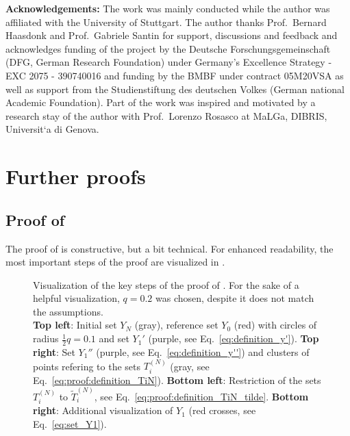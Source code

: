 \documentclass[a4paper, 10pt]{article}
\newlength\fwidth
\begin{document}
\textbf{Acknowledgements:}
The work was mainly conducted while the author was affiliated with the University of Stuttgart.
The author thanks Prof.\ Bernard Haasdonk and Prof.\ Gabriele Santin for support, discussions and feedback
and acknowledges funding of the project by the Deutsche Forschungsgemeinschaft (DFG, German Research Foundation) under Germany's Excellence Strategy - EXC 2075 - 390740016 and funding by the BMBF under contract 05M20VSA as well as support from the Studienstiftung des deutschen Volkes (German national Academic Foundation).
Part of the work was inspired and motivated by a research stay of the author with Prof.\ Lorenzo Rosasco at MaLGa, DIBRIS, Universit`a di Genova.
 
 
 

 
 
 
\appendix 

\section{Further proofs} \label{sec:proofs}

\subsection{Proof of }

The proof of  is constructive, but a bit technical.
For enhanced readability, the most important steps of the proof are visualized in .

\begin{figure}[t]
\setlength{}




\caption{Visualization of the key steps of the proof of .
For the sake of a helpful visualization, $q=0.2$ was chosen, despite it does not match the assumptions. \\
\textbf{Top left}: Initial set $Y_N$ (gray), reference set $Y_0$ (red) with circles of radius $\frac{1}{2} q = 0.1$ and set $Y_1'$ (purple, see Eq.~\eqref{eq:definition_y'}). 
\textbf{Top right}: Set $Y_1''$ (purple, see Eq.~\eqref{eq:definition_y''}) and clusters of points refering to the sets $T_i^{(N)}$ (gray, see Eq.~\eqref{eq:proof:definition_TiN}).
%
\textbf{Bottom left}: Restriction of the sets $T_i^{(N)}$ to $\tilde{T}_i^{(N)}$, see Eq.~\eqref{eq:proof:definition_TiN_tilde}. 
\textbf{Bottom right}: Additional visualization of $Y_1$ (red crosses, see Eq.~\eqref{eq:set_Y1}).}
\label{fig:vis_proof}
\end{figure}
\end{document}
